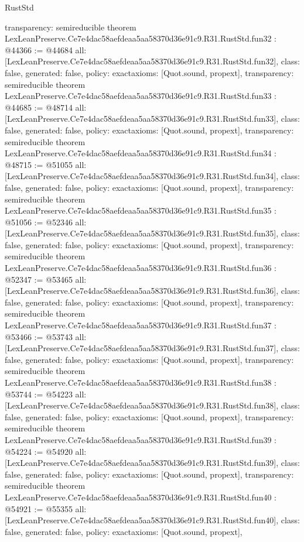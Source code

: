 \begin{lexlean}{RustStd}
\begin{coremodule}
{  transparency: semireducible
}
theorem LexLeanPreserve.Ce7e4dac58aefdeaa5aa58370d36e91c9.R31.RustStd.fun32 : @44366 := @44684 {
  all: [LexLeanPreserve.Ce7e4dac58aefdeaa5aa58370d36e91c9.R31.RustStd.fun32],
  class: false,
  generated: false,
  policy: exact{axioms: [Quot.sound, propext]},
  transparency: semireducible
}
theorem LexLeanPreserve.Ce7e4dac58aefdeaa5aa58370d36e91c9.R31.RustStd.fun33 : @44685 := @48714 {
  all: [LexLeanPreserve.Ce7e4dac58aefdeaa5aa58370d36e91c9.R31.RustStd.fun33],
  class: false,
  generated: false,
  policy: exact{axioms: [Quot.sound, propext]},
  transparency: semireducible
}
theorem LexLeanPreserve.Ce7e4dac58aefdeaa5aa58370d36e91c9.R31.RustStd.fun34 : @48715 := @51055 {
  all: [LexLeanPreserve.Ce7e4dac58aefdeaa5aa58370d36e91c9.R31.RustStd.fun34],
  class: false,
  generated: false,
  policy: exact{axioms: [Quot.sound, propext]},
  transparency: semireducible
}
theorem LexLeanPreserve.Ce7e4dac58aefdeaa5aa58370d36e91c9.R31.RustStd.fun35 : @51056 := @52346 {
  all: [LexLeanPreserve.Ce7e4dac58aefdeaa5aa58370d36e91c9.R31.RustStd.fun35],
  class: false,
  generated: false,
  policy: exact{axioms: [Quot.sound, propext]},
  transparency: semireducible
}
theorem LexLeanPreserve.Ce7e4dac58aefdeaa5aa58370d36e91c9.R31.RustStd.fun36 : @52347 := @53465 {
  all: [LexLeanPreserve.Ce7e4dac58aefdeaa5aa58370d36e91c9.R31.RustStd.fun36],
  class: false,
  generated: false,
  policy: exact{axioms: [Quot.sound, propext]},
  transparency: semireducible
}
theorem LexLeanPreserve.Ce7e4dac58aefdeaa5aa58370d36e91c9.R31.RustStd.fun37 : @53466 := @53743 {
  all: [LexLeanPreserve.Ce7e4dac58aefdeaa5aa58370d36e91c9.R31.RustStd.fun37],
  class: false,
  generated: false,
  policy: exact{axioms: [Quot.sound, propext]},
  transparency: semireducible
}
theorem LexLeanPreserve.Ce7e4dac58aefdeaa5aa58370d36e91c9.R31.RustStd.fun38 : @53744 := @54223 {
  all: [LexLeanPreserve.Ce7e4dac58aefdeaa5aa58370d36e91c9.R31.RustStd.fun38],
  class: false,
  generated: false,
  policy: exact{axioms: [Quot.sound, propext]},
  transparency: semireducible
}
theorem LexLeanPreserve.Ce7e4dac58aefdeaa5aa58370d36e91c9.R31.RustStd.fun39 : @54224 := @54920 {
  all: [LexLeanPreserve.Ce7e4dac58aefdeaa5aa58370d36e91c9.R31.RustStd.fun39],
  class: false,
  generated: false,
  policy: exact{axioms: [Quot.sound, propext]},
  transparency: semireducible
}
theorem LexLeanPreserve.Ce7e4dac58aefdeaa5aa58370d36e91c9.R31.RustStd.fun40 : @54921 := @55355 {
  all: [LexLeanPreserve.Ce7e4dac58aefdeaa5aa58370d36e91c9.R31.RustStd.fun40],
  class: false,
  generated: false,
  policy: exact{axioms: [Quot.sound, propext]},
}
\end{coremodule}
\end{lexlean}
